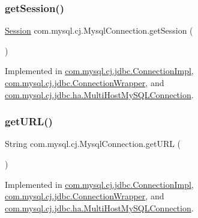 \mbox{\label{interfacecom_1_1mysql_1_1cj_1_1_mysql_connection_ac1220f01fc29222847acfba3035a860a}} 
\subsubsection{\texorpdfstring{get\+Session()}{getSession()}}
{\footnotesize\ttfamily \mbox{\hyperlink{interfacecom_1_1mysql_1_1cj_1_1_session}{Session}} com.\+mysql.\+cj.\+Mysql\+Connection.\+get\+Session (\begin{DoxyParamCaption}{ }\end{DoxyParamCaption})}



Implemented in \mbox{\hyperlink{classcom_1_1mysql_1_1cj_1_1jdbc_1_1_connection_impl_a70670228bbdfc0e4474904f57b87d64d}{com.\+mysql.\+cj.\+jdbc.\+Connection\+Impl}}, \mbox{\hyperlink{classcom_1_1mysql_1_1cj_1_1jdbc_1_1_connection_wrapper_a63453eb36923681973e47b1321058cde}{com.\+mysql.\+cj.\+jdbc.\+Connection\+Wrapper}}, and \mbox{\hyperlink{classcom_1_1mysql_1_1cj_1_1jdbc_1_1ha_1_1_multi_host_my_s_q_l_connection_a656ba156c1e99bf0e9d0a2fd5c3cb646}{com.\+mysql.\+cj.\+jdbc.\+ha.\+Multi\+Host\+My\+S\+Q\+L\+Connection}}.

\mbox{\label{interfacecom_1_1mysql_1_1cj_1_1_mysql_connection_a8fab6ed57d7f54fbd017890355b610a2}} 
\subsubsection{\texorpdfstring{get\+U\+R\+L()}{getURL()}}
{\footnotesize\ttfamily String com.\+mysql.\+cj.\+Mysql\+Connection.\+get\+U\+RL (\begin{DoxyParamCaption}{ }\end{DoxyParamCaption})}



Implemented in \mbox{\hyperlink{classcom_1_1mysql_1_1cj_1_1jdbc_1_1_connection_impl_a098f1e77842e56a64fad3854686fbe8a}{com.\+mysql.\+cj.\+jdbc.\+Connection\+Impl}}, \mbox{\hyperlink{classcom_1_1mysql_1_1cj_1_1jdbc_1_1_connection_wrapper_a9e241644319ccf0cbba174d5ebe5208b}{com.\+mysql.\+cj.\+jdbc.\+Connection\+Wrapper}}, and \mbox{\hyperlink{classcom_1_1mysql_1_1cj_1_1jdbc_1_1ha_1_1_multi_host_my_s_q_l_connection_a52febdf3fd28e122d17a8f0713427fa6}{com.\+mysql.\+cj.\+jdbc.\+ha.\+Multi\+Host\+My\+S\+Q\+L\+Connection}}.


